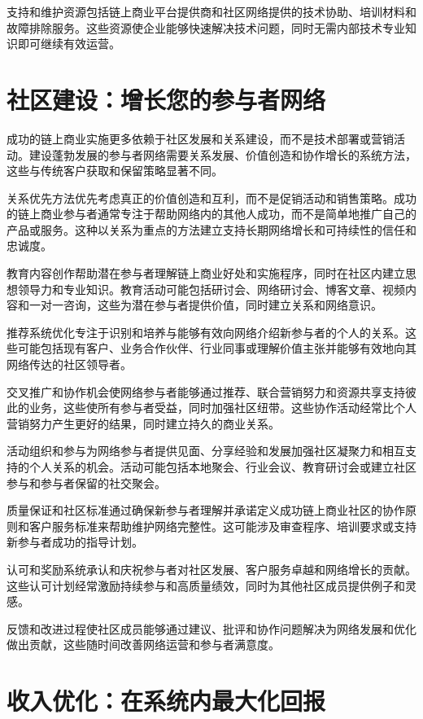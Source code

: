 \documentclass[
  Letterpaper,
]{scrbook}
\begin{document}
支持和维护资源包括链上商业平台提供商和社区网络提供的技术协助、培训材料和故障排除服务。这些资源使企业能够快速解决技术问题，同时无需内部技术专业知识即可继续有效运营。

\section{社区建设：增长您的参与者网络}\label{ux793eux533aux5efaux8bbeux589eux957fux60a8ux7684ux53c2ux4e0eux8005ux7f51ux7edc}

成功的链上商业实施更多依赖于社区发展和关系建设，而不是技术部署或营销活动。建设蓬勃发展的参与者网络需要关系发展、价值创造和协作增长的系统方法，这些与传统客户获取和保留策略显著不同。

关系优先方法优先考虑真正的价值创造和互利，而不是促销活动和销售策略。成功的链上商业参与者通常专注于帮助网络内的其他人成功，而不是简单地推广自己的产品或服务。这种以关系为重点的方法建立支持长期网络增长和可持续性的信任和忠诚度。

教育内容创作帮助潜在参与者理解链上商业好处和实施程序，同时在社区内建立思想领导力和专业知识。教育活动可能包括研讨会、网络研讨会、博客文章、视频内容和一对一咨询，这些为潜在参与者提供价值，同时建立关系和网络意识。

推荐系统优化专注于识别和培养与能够有效向网络介绍新参与者的个人的关系。这些可能包括现有客户、业务合作伙伴、行业同事或理解价值主张并能够有效地向其网络传达的社区领导者。

交叉推广和协作机会使网络参与者能够通过推荐、联合营销努力和资源共享支持彼此的业务，这些使所有参与者受益，同时加强社区纽带。这些协作活动经常比个人营销努力产生更好的结果，同时建立持久的商业关系。

活动组织和参与为网络参与者提供见面、分享经验和发展加强社区凝聚力和相互支持的个人关系的机会。活动可能包括本地聚会、行业会议、教育研讨会或建立社区参与和参与者保留的社交聚会。

质量保证和社区标准通过确保新参与者理解并承诺定义成功链上商业社区的协作原则和客户服务标准来帮助维护网络完整性。这可能涉及审查程序、培训要求或支持新参与者成功的指导计划。

认可和奖励系统承认和庆祝参与者对社区发展、客户服务卓越和网络增长的贡献。这些认可计划经常激励持续参与和高质量绩效，同时为其他社区成员提供例子和灵感。

反馈和改进过程使社区成员能够通过建议、批评和协作问题解决为网络发展和优化做出贡献，这些随时间改善网络运营和参与者满意度。

\section{收入优化：在系统内最大化回报}\label{ux6536ux5165ux4f18ux5316ux5728ux7cfbux7edfux5185ux6700ux5927ux5316ux56deux62a5}
\end{document}
